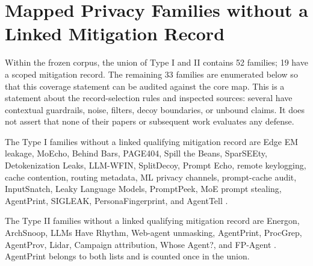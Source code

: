 \section{Mapped Privacy Families without a Linked Mitigation Record}\label{app:privacy-gaps}
Within the frozen corpus, the union of Type I and II contains 52 families; 19 have a scoped mitigation record. The remaining 33 families are enumerated below so that this coverage statement can be audited against the core map. This is a statement about the record-selection rules and inspected sources: several have contextual guardrails, noise, filters, decoy boundaries, or unbound claims. It does not assert that none of their papers or subsequent work evaluates any defense.

The Type I families without a linked qualifying mitigation record are Edge EM leakage, MoEcho, Behind Bars, PAGE404, Spill the Beans, SparSEEty, Detokenization Leaks, LLM-WFIN, SplitDecoy, Prompt Echo, remote keylogging, cache contention, routing metadata, ML privacy channels, prompt-cache audit, InputSnatch, Leaky Language Models, PromptPeek, MoE prompt stealing, AgentPrint, SIGLEAK, PersonaFingerprint, and AgentTell \cite{alhalawani2026physicaledge,ding2025moecho,gu2026behindbars,nazaraliyev2026page404,spillbeans2025,jo2026sparseety,weiss2026detokenization,jiao2025llmwfin,politis2026splitdecoy,prompt_echo2026,weiss2024prompt,abubakar2026contention,chen2026routingmetadata,debenedetti2024privacy,gu2025promptcaching,inputsnatch2024,majidi2026leakylms,promptpeek2025,yona2024stealing,agentprint2025,geng2026sigleak,song2026personafingerprint,shahriar2026agenttell}.

The Type II families without a linked qualifying mitigation record are Energon, ArchSnoop, LLMs Have Rhythm, Web-agent unmasking, AgentPrint, ProcGrep, AgentProv, Lidar, Campaign attribution, Whose Agent?, and FP-Agent \cite{chaudhuri2025energon,weng2026archsnoop,alhazbi2025rhythm,fayolle2026webagents,agentprint2025,oderinwale2026procgrep,wang2026agentprov,wang2026lidar,park2026crosscampaign,kang2026whoseagent,wang2026fpagent}. AgentPrint belongs to both lists and is counted once in the union.
